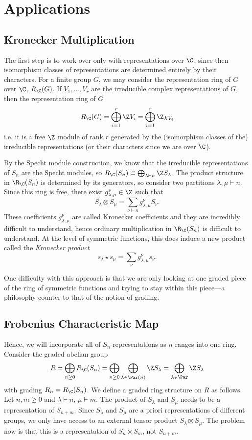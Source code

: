 \documentclass[../main.tex]{subfiles}
\begin{document}
\section{Applications}

\subsection{Kronecker Multiplication}
The first step is to work over only with representations over $ \C $, since then isomorphism classes of representations are determined entirely by their characters. For a finite group $ G $, we may consider the representation ring of $ G $ over $ \C $, $ R_\C(G) $. If $  V_{1},\ldots,V_{r}  $ are the irreducible complex representations of $ G $, then the representation ring of $ G $
\[
  R_{\C}(G) = \bigoplus_{i=1}^{r}\Z V_{i} = \bigoplus_{i=1}^{r}\Z\chi_{V_{i}}
\]
i.e. it is a free $ \Z $ module of rank $ r $ generated by the (isomorphism classes of the) irreducible representations (or their characters since we are over $ \C $). 

By the Specht module construction, we know that the irreducible representations of $ S_{n} $ are the Specht modules, so $ R_{\C}(S_{n}) \cong \bigoplus_{\lambda\vdash n}\Z S_{\lambda} $. The product structure in $ \R_{\C}(S_{n}) $ is determined by its generators, so consider two partitions $ \lambda,\mu\vdash n $. Since this ring is free, there exist $ g_{\lambda,\mu}^{\nu}\in \Z $ such that
\[
  S_{\lambda}\otimes S_{\mu} = \sum_{\nu\vdash n} g_{\lambda,\mu}^{\nu} S_{\nu}.
\]
These coefficients $ g_{\lambda,\mu}^{\nu} $ are called Kronecker coefficients and they are incredibly difficult to understand, hence ordinary multiplication in $ \R_{\C}(S_{n}) $ is difficult to understand. At the level of symmetric functions, this does induce a new product called the \textit{Kronecker product}
\[
  s_{\lambda}\star s_{\mu} = \sum_{\nu} g_{\lambda,\mu}^{\nu} s_{\nu}.
\]

One difficulty with this approach is that we are only looking at one graded piece of the ring of symmetric functions and trying to stay within this piece---a philosophy counter to that of the notion of grading. 

\subsection{Frobenius Characteristic Map}

Hence, we will incorporate all of $ S_{n} $-representations as $ n $ ranges into one ring. Consider the graded abelian group
\[
  R = \bigoplus_{n\geq0} R_{\C}(S_{n}) =\bigoplus_{n\geq0} \bigoplus_{\lambda\in \Par(n)} \Z S_{\lambda} = \bigoplus_{\lambda\in \Par} \Z S_{\lambda}
\]
with grading $ R_{n} = R_{\C}(S_{n}) $. We define a graded ring structure on $ R $ as follows. Let $ n,m\geq 0 $ and $\lambda\vdash n $, $ \mu\vdash m $. The product of $ S_{\lambda} $  and $ S_{\mu} $ needs to be a representation of $ S_{n+m} $. Since $ S_{\lambda} $ and $ S_{\mu} $ are a priori representations of different groups, we only have access to an external tensor product $ S_{\lambda}\boxtimes S_{\mu} $. The problem now is that this is a representation of $ S_{n}\times S_{m} $, not $ S_{n+m} $.
\end{document}
